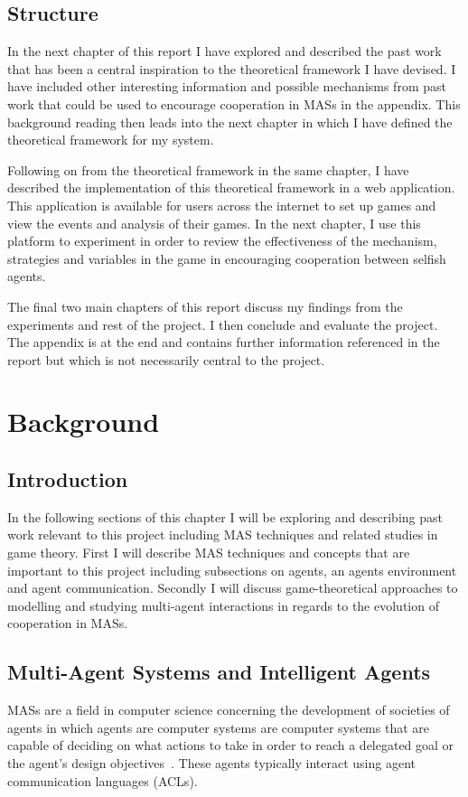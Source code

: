\documentclass[]{final_report}
\begin{document}
\section{Structure}
In the next chapter of this report I have explored and described the past work that has been a central inspiration to the theoretical framework I have devised. I have included other interesting information and possible mechanisms from past work that could be used to encourage cooperation in MASs in the appendix. This background reading then leads into the next chapter in which I have defined the theoretical framework for my system.\par
Following on from the theoretical framework in the same chapter, I have described the implementation of this theoretical framework in a web application. This application is available for users across the internet to set up games and view the events and analysis of their games. In the next chapter, I use this platform to experiment in order to review the effectiveness of the mechanism, strategies and variables in the game in encouraging cooperation between selfish agents.\par
The final two main chapters of this report discuss my findings from the experiments and rest of the project. I then conclude and evaluate the project. The appendix is at the end and contains further information referenced in the report but which is not necessarily central to the project.

\chapter{Background}

\section{Introduction}
In the following sections of this chapter I will be exploring and describing past work relevant to this project including MAS techniques and related studies in game theory. First I will describe MAS techniques and concepts that are important to this project including subsections on agents, an agents environment and agent communication. Secondly I will discuss game-theoretical approaches to modelling and studying multi-agent interactions in regards to the evolution of cooperation in MASs.

\section{Multi-Agent Systems and Intelligent Agents}
\label{sec:backgroundmas}
MASs are a field in computer science concerning the development of societies of agents in which agents are computer systems are computer systems that are capable of deciding on what actions to take in order to reach a delegated goal or the agent's design objectives~\cite{wooldridge2009introduction}. These agents typically interact using agent communication languages (ACLs).\par 
\end{document}
